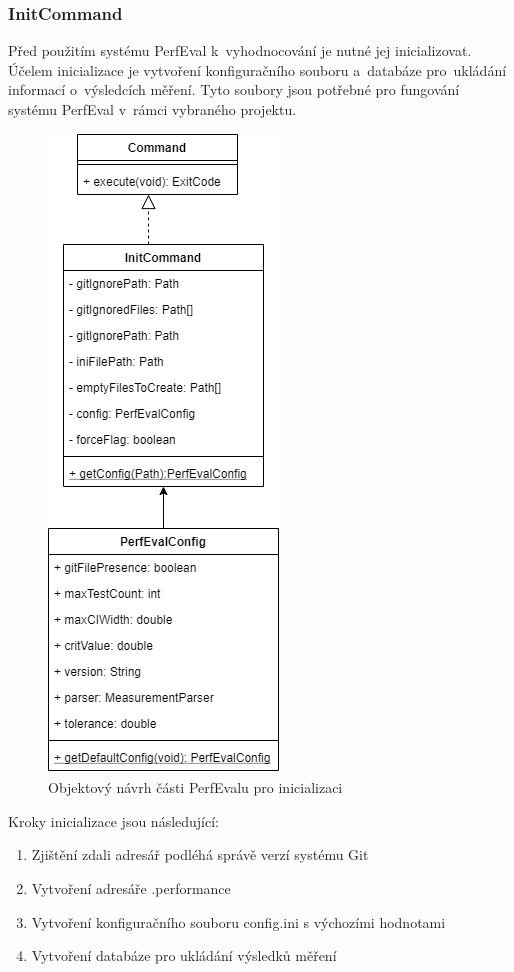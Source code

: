 \subsubsection{InitCommand}
Před použitím systému PerfEval k~vyhodnocování je nutné jej inicializovat.
Účelem inicializace je vytvoření konfiguračního souboru a~databáze pro~ukládání informací o~výsledcích měření.
Tyto soubory jsou potřebné pro fungování systému PerfEval v~rámci vybraného projektu.

\begin{figure}[!ht]
    \centering
    \includegraphics[height=0.47\textheight]{../img/perfeval_init.png}
    \caption{Objektový návrh části PerfEvalu pro inicializaci}
\end{figure}
\bigskip
Kroky inicializace jsou následující:
\begin{enumerate}
    \item Zjištění zdali adresář podléhá správě verzí systému Git
    \item Vytvoření adresáře .performance
    \item Vytvoření konfiguračního souboru config.ini s výchozími hodnotami
    \item Vytvoření databáze pro ukládání výsledků měření
\end{enumerate}

